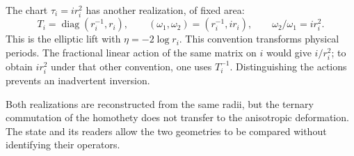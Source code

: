 The chart \(\tau_i=ir_i^2\) has another realization, of fixed area:
\[
 T_i=\operatorname{diag}(r_i^{-1},r_i),\qquad
 (\omega_1,\omega_2)=(r_i^{-1},ir_i),\qquad
 \omega_2/\omega_1=ir_i^2.
\]
This is the elliptic lift with \(\eta=-2\log r_i\). This convention transforms physical periods. The fractional linear action of the same matrix on \(i\) would give \(i/r_i^2\); to obtain \(ir_i^2\) under that other convention, one uses \(T_i^{-1}\). Distinguishing the actions prevents an inadvertent inversion.

Both realizations are reconstructed from the same radii, but the ternary commutation of the homothety does not transfer to the anisotropic deformation. The state and its readers allow the two geometries to be compared without identifying their operators.
